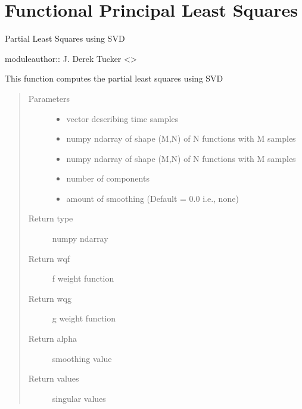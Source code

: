 \documentclass[letterpaper,10pt,english]{sphinxmanual}
\begin{document}
\chapter{Functional Principal Least Squares}
\label{\detokenize{fPLS:module-fPLS}}\label{\detokenize{fPLS:functional-principal-least-squares}}\label{\detokenize{fPLS::doc}}
Partial Least Squares using SVD

moduleauthor:: J. Derek Tucker \textless{}\textgreater{}

\begin{fulllineitems}
\label{\detokenize{fPLS:fPLS.pls_svd}}
This function computes the partial least squares using SVD
\begin{quote}\begin{description}
\item[{Parameters}] \leavevmode\begin{itemize}
\item {} 
 \textendash{} vector describing time samples

\item {} 
 \textendash{} numpy ndarray of shape (M,N) of N functions with M samples

\item {} 
 \textendash{} numpy ndarray of shape (M,N) of N functions with M samples

\item {} 
 \textendash{} number of components

\item {} 
 \textendash{} amount of smoothing (Default = 0.0 i.e., none)

\end{itemize}

\item[{Return type}] \leavevmode
numpy ndarray

\item[{Return wqf}] \leavevmode
f weight function

\item[{Return wqg}] \leavevmode
g weight function

\item[{Return alpha}] \leavevmode
smoothing value

\item[{Return values}] \leavevmode
singular values

\end{description}\end{quote}

\end{fulllineitems}
\end{document}
